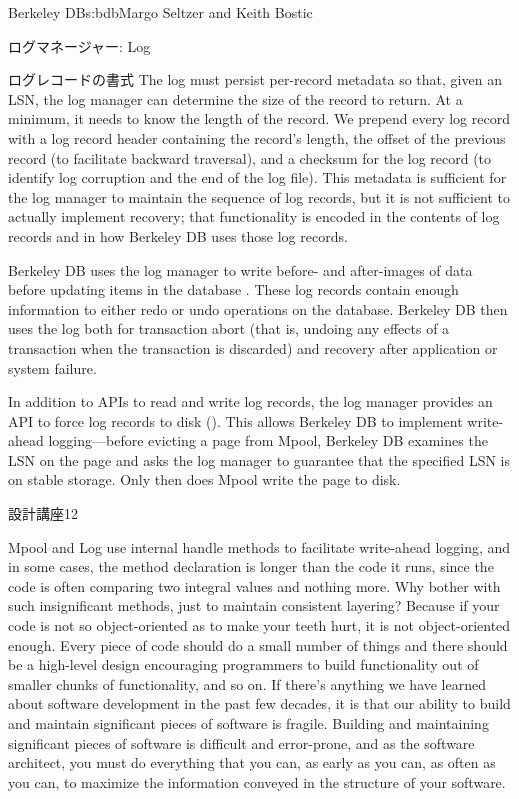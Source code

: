\begin{aosachapter}{Berkeley DB}{s:bdb}{Margo Seltzer and Keith Bostic}
\begin{aosasect1}{ログマネージャー: Log}
\begin{aosasect2}{ログレコードの書式}
The log must persist per-record metadata so that, given an LSN, the
log manager can determine the size of the record to return. At a
minimum, it needs to know the length of the record. We prepend every
log record with a log record header containing the record's length,
the offset of the previous record (to facilitate backward traversal),
and a checksum for the log record (to identify log corruption and the
end of the log file). This metadata is sufficient for the log manager
to maintain the sequence of log records, but it is not sufficient to
actually implement recovery; that functionality is encoded in the
contents of log records and in how Berkeley DB uses those log records.


Berkeley DB uses the log manager to write before- and after-images of
data before updating items in the database
\cite{bib:haerder:recovery}.  These log records contain enough
information to either redo or undo operations on the
database. Berkeley DB then uses the log both for transaction abort
(that is, undoing any effects of a transaction when the transaction is
discarded) and recovery after application or system failure.

In addition to APIs to read and write log records, the log manager
provides an API to force log records to disk
().  This allows Berkeley DB to
implement write-ahead logging---before evicting a page from Mpool,
Berkeley DB examines the LSN on the page and asks the log manager to
guarantee that the specified LSN is on stable storage. Only then does
Mpool write the page to disk. 

\begin{aosabox}{設計講座12}

Mpool and Log use internal handle methods to facilitate write-ahead
logging, and in some cases, the method declaration is longer than the
code it runs, since the code is often comparing two integral values
and nothing more. Why bother with such insignificant methods, just to
maintain consistent layering?  Because if your code is not so
object-oriented as to make your teeth hurt, it is not object-oriented
enough. Every piece of code should do a small number of things and
there should be a high-level design encouraging programmers to build
functionality out of smaller chunks of functionality, and so on. If
there's anything we have learned about software development in the
past few decades, it is that our ability to build and maintain
significant pieces of software is fragile. Building and maintaining
significant pieces of software is difficult and error-prone, and as
the software architect, you must do everything that you can, as early
as you can, as often as you can, to maximize the information conveyed
in the structure of your software.


\end{aosabox}
\end{aosasect2}
\end{aosasect1}
\end{aosachapter}
